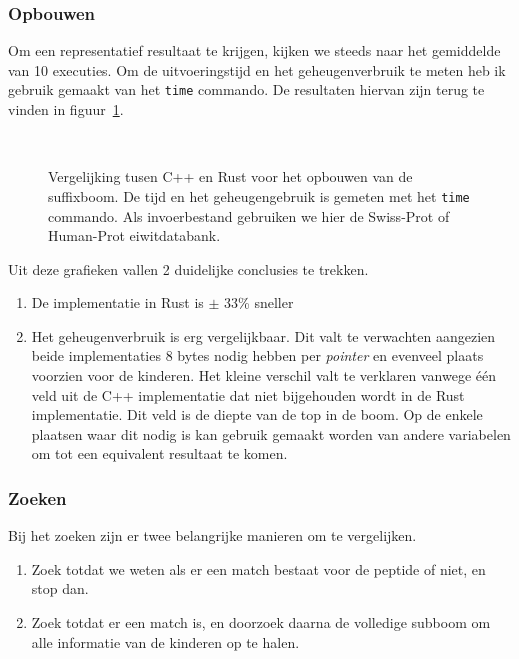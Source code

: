 \subsubsection{Opbouwen}
Om een representatief resultaat te krijgen, kijken we steeds naar het gemiddelde van 10 executies.
Om de uitvoeringstijd en het geheugenverbruik te meten heb ik gebruik gemaakt van het \texttt{time} commando.
De resultaten hiervan zijn terug te vinden in figuur~\ref{fig:tree_building}.
\begin{figure}[H]
    \centering
    \\[4ex] %

    \caption{Vergelijking tusen C++ en Rust voor het opbouwen van de suffixboom. De tijd en het geheugengebruik is gemeten met het \texttt{time} commando. Als invoerbestand gebruiken we hier de Swiss-Prot of Human-Prot eiwitdatabank.}\label{fig:tree_building}
\end{figure}

Uit deze grafieken vallen 2 duidelijke conclusies te trekken.
\begin{enumerate}
    \item De implementatie in Rust is $\pm$ 33\% sneller
    \item Het geheugenverbruik is erg vergelijkbaar.
    Dit valt te verwachten aangezien beide implementaties 8 bytes nodig hebben per \textit{pointer} en evenveel plaats voorzien voor de kinderen.
    Het kleine verschil valt te verklaren vanwege één veld uit de C++ implementatie dat niet bijgehouden wordt in de Rust implementatie.
    Dit veld is de diepte van de top in de boom.
    Op de enkele plaatsen waar dit nodig is kan gebruik gemaakt worden van andere variabelen om tot een equivalent resultaat te komen.
\end{enumerate}

\subsubsection{Zoeken}
Bij het zoeken zijn er twee belangrijke manieren om te vergelijken.
\begin{enumerate}
    \item Zoek totdat we weten als er een match bestaat voor de peptide of niet, en stop dan.
    \item Zoek totdat er een match is, en doorzoek daarna de volledige subboom om alle informatie van de kinderen op te halen.

\end{enumerate}

